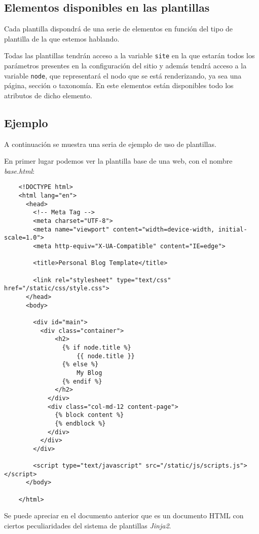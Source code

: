 \subsection{Elementos disponibles en las plantillas}

Cada plantilla dispondrá de una serie de elementos en función del tipo de plantilla de la que estemos
hablando.

Todas las plantillas tendrán acceso a la variable \texttt{site} en la que estarán todos los parámetros
presentes en la configuración del sitio y además tendrá acceso a la variable \texttt{node}, que representará
el nodo que se está renderizando, ya sea una página, sección o taxonomía. En este elementos están disponibles
todo los atributos de dicho elemento.

\subsection{Ejemplo}

A continuación se muestra una seria de ejemplo de uso de plantillas.

En primer lugar podemos ver la plantilla base de una web, con el nombre \textit{base.html}:

\begin{verbatim}
    <!DOCTYPE html>
    <html lang="en">
      <head>
        <!-- Meta Tag -->
        <meta charset="UTF-8">
        <meta name="viewport" content="width=device-width, initial-scale=1.0">
        <meta http-equiv="X-UA-Compatible" content="IE=edge">

        <title>Personal Blog Template</title>

        <link rel="stylesheet" type="text/css" href="/static/css/style.css">
      </head>
      <body>

        <div id="main">
          <div class="container">
              <h2>
                {% if node.title %}
                    {{ node.title }}
                {% else %}
                    My Blog
                {% endif %}
              </h2>
            </div>
            <div class="col-md-12 content-page">
              {% block content %}
              {% endblock %}
            </div>
          </div>
        </div>

        <script type="text/javascript" src="/static/js/scripts.js"></script>
      </body>

    </html>
\end{verbatim}

Se puede apreciar en el documento anterior que es un documento HTML con ciertos peculiaridades del
sistema de plantillas \textit{Jinja2}.

